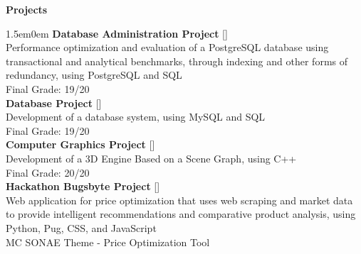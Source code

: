 \noindent\textbf{Projects}
\noindent\hrulefill
\vspace{0.25em}
\begin{adjustwidth}{1.5em}{0em}
\textbf{Database Administration Project} \hfill [\href{https://github.com/a104437ana/ABD}{\faGithub}] \\
Performance optimization and evaluation of a PostgreSQL database using transactional and analytical benchmarks, through indexing and other forms of redundancy, using PostgreSQL and SQL\\
Final Grade: 19/20
\vspace{0.5em}
\\
\textbf{Database Project} \hfill [\href{https://github.com/a104437ana/BD}{\faGithub}] \\
Development of a database system, using MySQL and SQL\\
Final Grade: 19/20
\vspace{0.5em}
\\
\textbf{Computer Graphics Project} \hfill [\href{https://github.com/a104437ana/CG}{\faGithub}] \\
Development of a 3D Engine Based on a Scene Graph, using C++\\
Final Grade: 20/20
\vspace{0.5em}
\\
\textbf{Hackathon Bugsbyte Project} \hfill [\href{https://github.com/a104437ana/HACKATHON-BUGSBYTE-2025}{\faGithub}] \\
Web application for price optimization that uses web scraping and market data to provide intelligent recommendations and comparative product analysis, using Python, Pug, CSS, and JavaScript\\
MC SONAE Theme - Price Optimization Tool
\end{adjustwidth}
\vspace{0.25em}